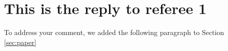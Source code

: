 \section{This is the reply to referee 1\label{sec:r1}}

To address your comment, we added the following paragraph to Section \ref{sec:paper}

\begin{quote}
{\em {}}
\end{quote}